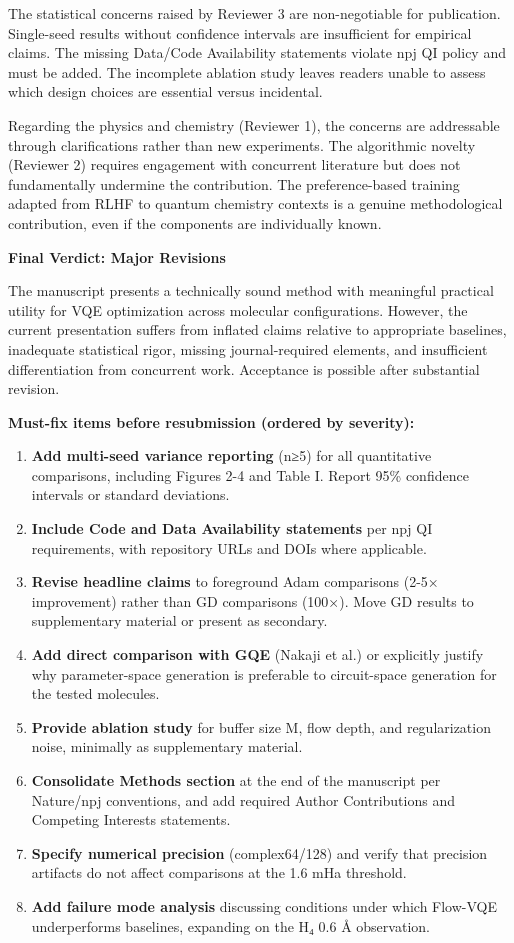 \documentclass[10pt,letterpaper]{article}
\begin{document}
The statistical concerns raised by Reviewer 3 are non-negotiable for publication. Single-seed results without confidence intervals are insufficient for empirical claims. The missing Data/Code Availability statements violate npj QI policy and must be added. The incomplete ablation study leaves readers unable to assess which design choices are essential versus incidental.

Regarding the physics and chemistry (Reviewer 1), the concerns are addressable through clarifications rather than new experiments. The algorithmic novelty (Reviewer 2) requires engagement with concurrent literature but does not fundamentally undermine the contribution. The preference-based training adapted from RLHF to quantum chemistry contexts is a genuine methodological contribution, even if the components are individually known.

\textbf{Final Verdict: Major Revisions}

The manuscript presents a technically sound method with meaningful practical utility for VQE optimization across molecular configurations. However, the current presentation suffers from inflated claims relative to appropriate baselines, inadequate statistical rigor, missing journal-required elements, and insufficient differentiation from concurrent work. Acceptance is possible after substantial revision.

\textbf{Must-fix items before resubmission (ordered by severity):}

\begin{enumerate}
\def\labelenumi{\arabic{enumi}.}
\item
  \textbf{Add multi-seed variance reporting} (n≥5) for all quantitative comparisons, including Figures 2-4 and Table I. Report 95\% confidence intervals or standard deviations.
\item
  \textbf{Include Code and Data Availability statements} per npj QI requirements, with repository URLs and DOIs where applicable.
\item
  \textbf{Revise headline claims} to foreground Adam comparisons (2-5× improvement) rather than GD comparisons (100×). Move GD results to supplementary material or present as secondary.
\item
  \textbf{Add direct comparison with GQE} (Nakaji et al.) or explicitly justify why parameter-space generation is preferable to circuit-space generation for the tested molecules.
\item
  \textbf{Provide ablation study} for buffer size M, flow depth, and regularization noise, minimally as supplementary material.
\item
  \textbf{Consolidate Methods section} at the end of the manuscript per Nature/npj conventions, and add required Author Contributions and Competing Interests statements.
\item
  \textbf{Specify numerical precision} (complex64/128) and verify that precision artifacts do not affect comparisons at the 1.6 mHa threshold.
\item
  \textbf{Add failure mode analysis} discussing conditions under which Flow-VQE underperforms baselines, expanding on the H₄ 0.6 Å observation.
\end{enumerate}
\end{document}
